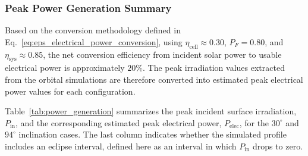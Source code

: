 \subsubsection{Peak Power Generation Summary}
\label{subsub:eps_peak_power_generation_summary}

Based on the conversion methodology defined in Eq.~\eqref{eq:eps_electrical_power_conversion}, using \(\eta_{\mathrm{cell}} \approx 0.30\), \(P_F = 0.80\), and \(\eta_{\mathrm{sys}} \approx 0.85\), the net conversion efficiency from incident solar power to usable electrical power is approximately \(20\%\). The peak irradiation values extracted from the orbital simulations are therefore converted into estimated peak electrical power values for each configuration.

Table~\ref{tab:power_generation} summarizes the peak incident surface irradiation, \(P_{\mathrm{in}}\), and the corresponding estimated peak electrical power, \(P_{\mathrm{elec}}\), for the \(30^\circ\) and \(94^\circ\) inclination cases. The last column indicates whether the simulated profile includes an eclipse interval, defined here as an interval in which \(P_{\mathrm{in}}\) drops to zero.

\begin{table}[h!]
\centering
\caption{Summary of peak surface irradiation and estimated usable electrical power for the EPS simulation cases, assuming \(\eta_{\mathrm{total}} \approx 20\%\).}
\label{tab:power_generation}
\renewcommand{\arraystretch}{1.3}
\end{table}

